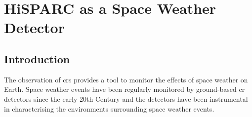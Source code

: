 \chapter{HiSPARC as a Space Weather Detector}\label{chap:HiSPARC}

\section{Introduction}\label{sec:HS_intro}

%
%
%
%


The observation of \glspl{cr} provides a tool to monitor the effects of space weather on Earth. Space weather events have been regularly monitored by ground-based \gls{cr} detectors since the early 20th Century \citep{forbush_effects_1937, kudela_cosmic_2000, schwenn_space_2006} and the detectors have been instrumental in characterising the environments surrounding space weather events.


